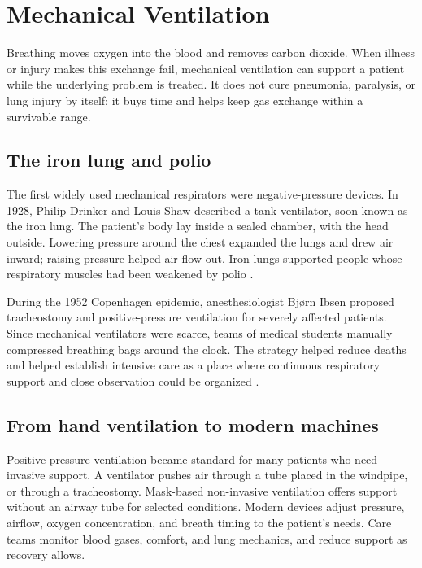 \documentclass[12pt,oneside]{book}
\begin{document}
\chapter[Mechanical Ventilation]{Mechanical Ventilation}

Breathing moves oxygen into the blood and removes carbon dioxide. When illness
or injury makes this exchange fail, mechanical ventilation can support a
patient while the underlying problem is treated. It does not cure pneumonia,
paralysis, or lung injury by itself; it buys time and helps keep gas exchange
within a survivable range.

\section{The iron lung and polio}
The first widely used mechanical respirators were negative-pressure devices.
In 1928, Philip Drinker and Louis Shaw described a tank ventilator, soon
known as the iron lung. The patient's body lay inside a sealed chamber, with
the head outside. Lowering pressure around the chest expanded the lungs and
drew air inward; raising pressure helped air flow out. Iron lungs supported
people whose respiratory muscles had been weakened by polio
\cite{drinkerShaw1929,homeVentilationHistory}.

During the 1952 Copenhagen epidemic, anesthesiologist Bjørn Ibsen proposed
tracheostomy and positive-pressure ventilation for severely affected
patients. Since mechanical ventilators were scarce, teams of medical
students manually compressed breathing bags around the clock. The strategy
helped reduce deaths and helped establish intensive care as a place where
continuous respiratory support and close observation could be organized
\cite{ibsenCopenhagen,ibsenIntensiveCare}.

\section{From hand ventilation to modern machines}
Positive-pressure ventilation became standard for many patients who need
invasive support. A ventilator pushes air through a tube placed in the
windpipe, or through a tracheostomy. Mask-based non-invasive ventilation
offers support without an airway tube for selected conditions. Modern
devices adjust pressure, airflow, oxygen concentration, and breath timing
to the patient's needs. Care teams monitor blood gases, comfort, and lung
mechanics, and reduce support as recovery allows.
\end{document}
